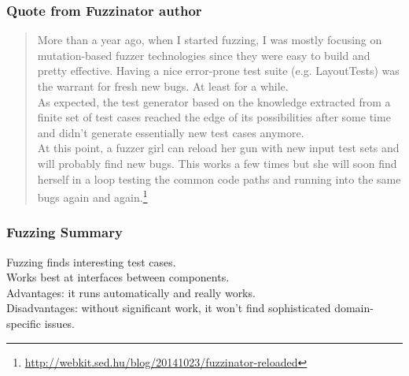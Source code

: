 \documentclass{beamer}
\newenvironment{changemargin}[1]{%
  \begin{list}{}{%
    \setlength{\topsep}{0pt}%
    \setlength{\leftmargin}{#1}%
    \setlength{\rightmargin}{1em}
    \setlength{\listparindent}{\parindent}%
    \setlength{\itemindent}{\parindent}%
    \setlength{\parsep}{\parskip}%
  }%
  \item[]}{\end{list}}
\begin{document}
\begin{frame}
  \frametitle{Quote from Fuzzinator author}
\begin{changemargin}{2em}
\begin{quote}
  More than a year ago, when I started fuzzing, I was mostly focusing on mutation-based fuzzer technologies since they were easy to build and pretty effective. Having a nice error-prone test suite (e.g. LayoutTests) was the warrant for fresh new bugs. At least for a while.\\[1em]

  As expected, the test generator based on the knowledge extracted from a finite set of test cases reached the edge of its possibilities after some time and didn't generate essentially new test cases anymore.\\[1em]

  At this point, a fuzzer girl can reload her gun with new input test sets and will probably find new bugs. This works a few times but she will soon find herself in a loop testing the common code paths and running into the same bugs again and again.\footnote{\url{http://webkit.sed.hu/blog/20141023/fuzzinator-reloaded}}
\end{quote}
\end{changemargin}
\end{frame}

\begin{frame}
  \frametitle{Fuzzing Summary}
  \large
  \begin{changemargin}{2em}
    Fuzzing finds interesting test cases.\\[1em]
    
    Works best at interfaces between components.\\[1em]
    
    Advantages: it runs automatically and really works.\\
    Disadvantages: without
significant work, it won't find sophisticated domain-specific issues.
  \end{changemargin}
\end{frame}

\end{document}
